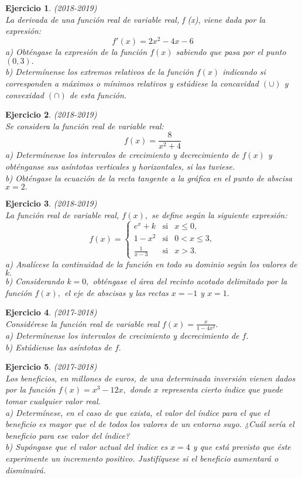 \documentclass[12pt, a4paper]{amsart}
\newtheorem{ejer}{Ejercicio}
\begin{document}
\begin{ejer}\em (2018-2019)\\
La derivada de una función real de variable real, f (x), viene dada por la expresión:
\[f'(x) = 2x^2 - 4x - 6\]
a) Obténgase la expresión de la función $f(x)$ sabiendo que pasa por el punto $(0, 3).$\\
b) Determínense los extremos relativos de la función $f(x)$ indicando si corresponden a máximos o mínimos relativos y estúdiese la concavidad $(\cup)$ y convexidad $(\cap)$ de esta función.
\end{ejer}

\begin{ejer}\em (2018-2019)\\
Se considera la función real de variable real:
\[f(x)=\frac{8}{x^2+4}\]
a) Determínense los intervalos de crecimiento y decrecimiento de $f(x)$ y obténganse sus asíntotas verticales y horizontales, si las tuviese.\\
b) Obténgase la ecuación de la recta tangente a la gráfica en el punto de abscisa $x = 2.$
\end{ejer}

\begin{ejer}\em (2018-2019)\\
La función real de variable real, $f(x),$ se define según la siguiente expresión:
\[
f(x)=\left \{ \begin{matrix}
e^x+k & \text{si} & x\leq 0,\\
1-x^2 & \text{si} & 0<x\leq 3,\\
\frac{1}{x-3} & \text{si} & x> 3.
\end{matrix}\right.
\]
a) Analícese la continuidad de la función en todo su dominio según los valores de $k.$\\
b) Considerando $k = 0,$ obténgase el área del recinto acotado delimitado por la función $f (x),$ el eje de abscisas y las rectas $x = - 1$ y $x = 1.$
\end{ejer}

\begin{ejer}\em (2017-2018)\\
Considérese la función real de variable real $f(x)=\frac{x}{1-4x^2}.$\\
a) Determínense los intervalos de crecimiento y decrecimiento de $f.$\\
b) Estúdiense las asíntotas de $f.$
\end{ejer}

\begin{ejer}\em (2017-2018)\\
Los beneficios, en millones de euros, de una determinada inversión vienen dados por la función $f(x) = x^3 - 12x,$ donde $x$ representa cierto índice que puede tomar cualquier valor real.\\
a) Determínese, en el caso de que exista, el valor del índice para el que el beneficio es mayor que el de todos los valores de un entorno suyo. ¿Cuál sería el beneficio para ese valor del índice?\\
b) Supóngase que el valor actual del índice es $x = 4$ y que está previsto que éste experimente un incremento positivo. Justifíquese si el beneficio aumentará o disminuirá.
\end{ejer}
\end{document}
